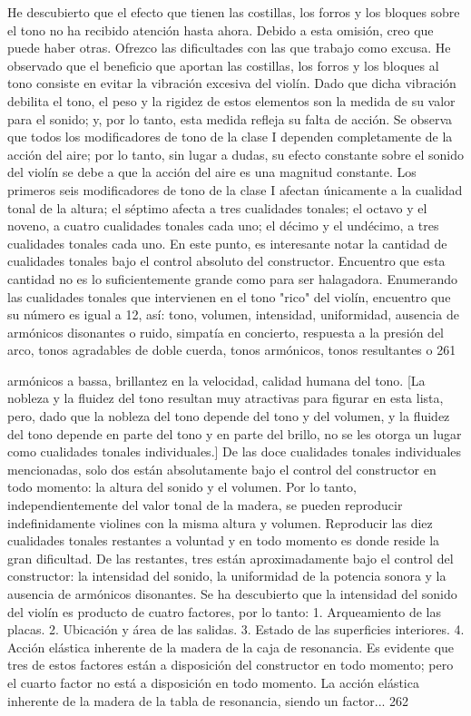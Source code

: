 He descubierto que el efecto que tienen las costillas, los forros y los bloques sobre el tono no ha recibido atención hasta ahora. Debido a esta omisión, creo que puede haber otras. Ofrezco las dificultades con las que trabajo como excusa. He observado que el beneficio que aportan las costillas, los forros y los bloques al tono consiste en evitar la vibración excesiva del violín. Dado que dicha vibración debilita el tono, el peso y la rigidez de estos elementos son la medida de su valor para el sonido; y, por lo tanto, esta medida refleja su falta de acción.
Se observa que todos los modificadores de tono de la clase I dependen completamente de la acción del aire; por lo tanto, sin lugar a dudas, su efecto constante sobre el sonido del violín se debe a que la acción del aire es una magnitud constante. Los primeros seis modificadores de tono de la clase I afectan únicamente a la cualidad tonal de la altura; el séptimo afecta a tres cualidades tonales; el octavo y el noveno, a cuatro cualidades tonales cada uno; el décimo y el undécimo, a tres cualidades tonales cada uno.
En este punto, es interesante notar la cantidad de cualidades tonales bajo el control absoluto del constructor. Encuentro que esta cantidad no es lo suficientemente grande como para ser halagadora. Enumerando las cualidades tonales que intervienen en el tono "rico" del violín, encuentro que su número es igual a 12, así: tono, volumen, intensidad, uniformidad, ausencia de armónicos disonantes o ruido, simpatía en concierto, respuesta a la presión del arco, tonos agradables de doble cuerda, tonos armónicos, tonos resultantes o
261

armónicos a bassa, brillantez en la velocidad, calidad humana del tono.
[La nobleza y la fluidez del tono resultan muy atractivas para figurar en esta lista, pero, dado que la nobleza del tono depende del tono y del volumen, y la fluidez del tono depende en parte del tono y en parte del brillo, no se les otorga un lugar como cualidades tonales individuales.]
De las doce cualidades tonales individuales mencionadas, solo dos están absolutamente bajo el control del constructor en todo momento: la altura del sonido y el volumen. Por lo tanto, independientemente del valor tonal de la madera, se pueden reproducir indefinidamente violines con la misma altura y volumen. Reproducir las diez cualidades tonales restantes a voluntad y en todo momento es donde reside la gran dificultad. De las restantes, tres están aproximadamente bajo el control del constructor: la intensidad del sonido, la uniformidad de la potencia sonora y la ausencia de armónicos disonantes.
Se ha descubierto que la intensidad del sonido del violín es producto de cuatro factores, por lo tanto:
1. Arqueamiento de las placas.
2. Ubicación y área de las salidas.
3. Estado de las superficies interiores.
4. Acción elástica inherente de la madera de la caja de resonancia.
Es evidente que tres de estos factores están a disposición del constructor en todo momento; pero el cuarto factor no está a disposición en todo momento. La acción elástica inherente de la madera de la tabla de resonancia, siendo un factor...
262

